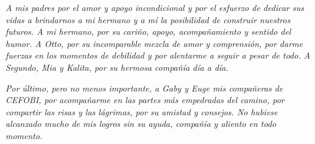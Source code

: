 \begin{spacing}{1}
\emph{A mis padres por el amor y apoyo incondicional y por el esfuerzo  de  dedicar  sus  vidas  a  brindarnos  a mi hermano y a mí la  posibilidad  de construir nuestros futuros. A mi hermano, por su cariño, apoyo, acompañamiento y sentido del humor. A Otto, por su incomparable mezcla de amor y comprensión, por darme fuerzas en los momentos de debilidad y por alentarme a seguir a pesar de todo. A Segundo, Mia y Kalita, por su hermosa compañía día a día.}

\emph{Por último, pero no menos importante, a Gaby y Euge mis compañeras de CEFOBI, por acompañarme en las partes más empedradas del camino, por compartir las risas y las  lágrimas, por su amistad y consejos. No hubiese alcanzado mucho de mis logros sin su ayuda, compañía y aliento en todo momento.}
\end{spacing}



